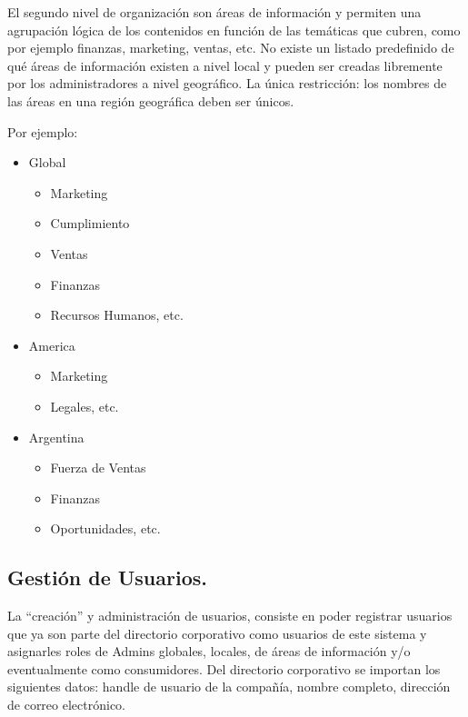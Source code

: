 \label{usecases:geolevel2}
El segundo nivel de organización son áreas de información y permiten una agrupación lógica de los contenidos en función de las temáticas que cubren, como por ejemplo finanzas, marketing, ventas, etc. No existe un listado predefinido de qué áreas de información existen a nivel local y pueden ser creadas libremente por los administradores a nivel geográfico. La única restricción: los nombres de las áreas en una región geográfica deben ser únicos.


Por ejemplo:

\begin{itemize}
\item Global
    \begin{itemize}
        \item Marketing
        \item Cumplimiento
        \item Ventas
        \item Finanzas
        \item Recursos Humanos, etc.
    \end{itemize}
	\item America
		\begin{itemize}
		    \item Marketing
            \item Legales, etc.
        \end{itemize}
	\item Argentina
        \begin{itemize}
            \item Fuerza de Ventas
            \item Finanzas
            \item Oportunidades, etc.	
        \end{itemize}
\end{itemize}

\subsection{Gestión de Usuarios.}
\label{usecases:useradmin}

La “creación” y administración de usuarios, consiste en poder registrar usuarios que ya son parte del directorio corporativo como usuarios de este sistema y asignarles roles de Admins globales, locales, de áreas de información y/o eventualmente como consumidores. Del directorio corporativo se importan los siguientes datos: handle de usuario de la compañía, nombre completo, dirección de correo electrónico.

